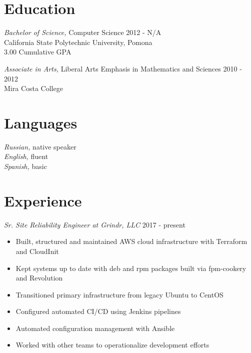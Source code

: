 \documentclass[line]{tex/res}
\begin{document}
\address{}
\address{Email: me@smaslennikov.com}

\begin{resume}

\section{Education}
\vspace{0.1in}
	{\sl Bachelor of Science,} Computer Science \hfill 2012 - N/A\\
	California State Polytechnic University, Pomona \\
	3.00 Cumulative GPA

	{\sl Associate in Arts,} Liberal Arts Emphasis in Mathematics and Sciences \hfill 2010 - 2012 \\
	Mira Costa College

\section{Languages}
	{\sl Russian,} native speaker \\
	{\sl English,} fluent \\
    {\sl Spanish,} basic

\section{Experience}
    {\sl Sr. Site Reliability Engineer at Grindr, LLC} \hfill 2017 - present
    \begin{itemize} \itemsep -2pt %
        \item Built, structured and maintained AWS cloud infrastructure with Terraform and CloudInit
        \item Kept systems up to date with deb and rpm packages built via fpm-cookery and Revolution
        \item Transitioned primary infrastructure from legacy Ubuntu to CentOS
        \item Configured automated CI/CD using Jenkins pipelines
        \item Automated configuration management with Ansible
        \item Worked with other teams to operationalize development efforts
    \end{itemize}


\end{resume}
\end{document}
